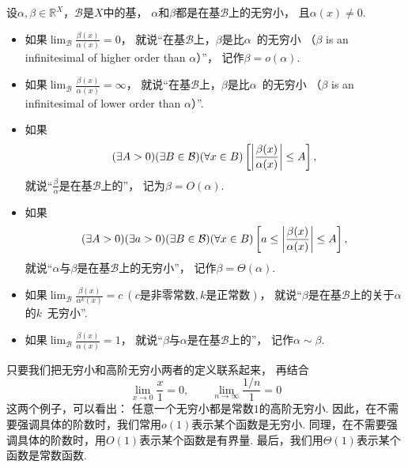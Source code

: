 \begin{definition}\label{definition:无穷小和无穷大.无穷小的比较}
设\(\alpha,\beta\in\mathbb{R}^X\)，\(\mathcal{B}\)是\(X\)中的基，
\(\alpha\)和\(\beta\)都是在基\(\mathcal{B}\)上的无穷小，
且\(\alpha(x)\neq0\).
\newcommand{\lf}[1][]{\lim_\mathcal{B} \frac{\beta(x)}{\alpha^{#1}(x)}}
\begin{itemize}
	\item 如果\(\lf=0\)，
	就说“在基\(\mathcal{B}\)上，\(\beta\)是比\(\alpha\)~的无穷小
	（\(\beta\) is an infinitesimal of higher order than \(\alpha\)）”，
	记作\(\beta=o(\alpha)\).

	\item 如果\(\lf=\infty\)，
	就说“在基\(\mathcal{B}\)上，\(\beta\)是比\(\alpha\)~的无穷小
	（\(\beta\) is an infinitesimal of lower order than \(\alpha\)）”.

	\item 如果\begin{equation*}
		(\exists A>0)
		(\exists B\in\mathcal{B})
		(\forall x\in B)
		\left[
			\abs{\frac{\beta(x)}{\alpha(x)}} \leq A
		\right],
	\end{equation*}
	就说“\(\frac\beta\alpha\)是在基\(\mathcal{B}\)上的”，
	记为\(\beta = O(\alpha)\).

	\item 如果\begin{equation*}
		(\exists A>0)
		(\exists a>0)
		(\exists B\in\mathcal{B})
		(\forall x\in B)
		\left[
			a \leq \abs{\frac{\beta(x)}{\alpha(x)}} \leq A
		\right],
	\end{equation*}
	就说“\(\alpha\)与\(\beta\)是在基\(\mathcal{B}\)上的无穷小”，
	记作\(\beta = \Theta(\alpha)\).

	\item 如果\(\lf[k]=c\ (\text{$c$是非零常数},\text{$k$是正常数})\)，
	就说“\(\beta\)是在基\(\mathcal{B}\)上的关于\(\alpha\)的\(k\)~无穷小”.

	\item 如果\(\lf=1\)，
	就说“\(\beta\)与\(\alpha\)是在基\(\mathcal{B}\)上的”，
	记作\(\alpha\sim\beta\).
\end{itemize}
\end{definition}
\begin{remark}
只要我们把无穷小和高阶无穷小两者的定义联系起来，
再结合\begin{equation*}
	\lim_{x\to0} \frac{x}{1} = 0,
	\qquad
	\lim_{n\to\infty} \frac{1/n}{1} = 0
\end{equation*}这两个例子，可以看出：
任意一个无穷小都是常数\(1\)的高阶无穷小.
因此，在不需要强调具体的阶数时，我们常用\(o(1)\)表示某个函数是无穷小.
同理，在不需要强调具体的阶数时，用\(O(1)\)表示某个函数是有界量.
最后，我们用\(\Theta(1)\)表示某个函数是常数函数.
\end{remark}

